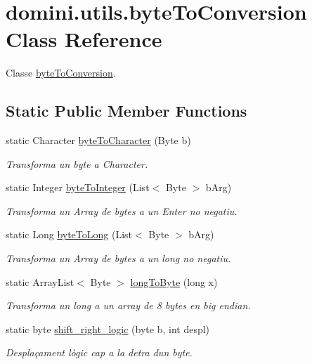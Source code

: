\hypertarget{classdomini_1_1utils_1_1byteToConversion}{}\section{domini.\+utils.\+byte\+To\+Conversion Class Reference}
\label{classdomini_1_1utils_1_1byteToConversion}


Classe \hyperlink{classdomini_1_1utils_1_1byteToConversion}{byte\+To\+Conversion}.  


\subsection*{Static Public Member Functions}
\begin{DoxyCompactItemize}
\item 
static Character \hyperlink{classdomini_1_1utils_1_1byteToConversion_a5d2f5f8de52e4001cf6698ca03fe31e8}{byte\+To\+Character} (Byte b)
\begin{DoxyCompactList}\small\item\em Transforma un byte a Character. \end{DoxyCompactList}\item 
static Integer \hyperlink{classdomini_1_1utils_1_1byteToConversion_a3242a47adade49b6cfa6a9232944f587}{byte\+To\+Integer} (List$<$ Byte $>$ b\+Arg)
\begin{DoxyCompactList}\small\item\em Transforma un Array de bytes a un Enter no negatiu. \end{DoxyCompactList}\item 
static Long \hyperlink{classdomini_1_1utils_1_1byteToConversion_a18600284c32cae9284c16c6396425d5a}{byte\+To\+Long} (List$<$ Byte $>$ b\+Arg)
\begin{DoxyCompactList}\small\item\em Transforma un Array de bytes a un long no negatiu. \end{DoxyCompactList}\item 
static Array\+List$<$ Byte $>$ \hyperlink{classdomini_1_1utils_1_1byteToConversion_ab4466a4c6dd5f6a350953031e99a959d}{long\+To\+Byte} (long x)
\begin{DoxyCompactList}\small\item\em Transforma un long a un array de 8 bytes en big endian. \end{DoxyCompactList}\item 
static byte \hyperlink{classdomini_1_1utils_1_1byteToConversion_a0e232cb9d272ccc13accda58bab9f8e1}{shift\+\_\+right\+\_\+logic} (byte b, int despl)
\begin{DoxyCompactList}\small\item\em Desplaçament lògic cap a la detra d\textquotesingle{}un byte. \end{DoxyCompactList}\end{DoxyCompactItemize}


